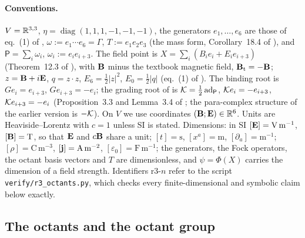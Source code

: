 \paragraph{Conventions.} $V=\mathbb{R}^{3,3}$, $\eta=\operatorname{diag}(1,1,1,-1,-1,-1)$, the generators $e_1,\dots,e_6$ are those of eq.~(1) of
\cite{ES17}, $\omega:=e_1\cdots e_6=\Gamma$, $T:=e_1e_2e_3$ (the mass form, Corollary~18.4 of \cite{ES17}), and $\mathsf P=\sum_i\omega_i$,
$\omega_i:=e_ie_{i+3}$. The field point is $X=\sum_i(B_ie_i+E_ie_{i+3})$ (Theorem~12.3 of \cite{ES17}), with $\mathbf B$ minus the textbook magnetic
field, $\mathbf B_{\rm t}=-\mathbf B$; $z=\mathbf B+i\mathbf E$, $q=z\cdot z$, $E_6=\tfrac12|z|^2$, $E_0=\tfrac12|q|$ (eq.~(1) of \cite{RE}). The binding root is
$Ge_i=e_{i+3}$, $Ge_{i+3}=-e_i$; the grading root of \cite{ES17} is $\mathcal K=\tfrac12\operatorname{ad}_{\mathsf P}$, $\mathcal K e_i=-e_{i+3}$, $\mathcal K e_{i+3}=-e_i$
(Proposition~3.3 and Lemma~3.4 of \cite{ES17}; the para-complex structure of the earlier version is $-\mathcal K$). On $V$ we use coordinates
$(\mathbf B;\mathbf E)\in\mathbb{R}^6$. Units are Heaviside--Lorentz with $c=1$ unless SI is stated. Dimensions: in SI $[\mathbf E]=\mathrm{V\,m^{-1}}$,
$[\mathbf B]=\mathrm T$, so that $\mathbf E$ and $c\mathbf B$ share a unit; $[t]=\mathrm s$, $[x^a]=\mathrm m$, $[\partial_a]=\mathrm m^{-1}$; $[\rho]=\mathrm{C\,m^{-3}}$,
$[\mathbf j]=\mathrm{A\,m^{-2}}$, $[\varepsilon_0]=\mathrm{F\,m^{-1}}$; the generators, the Fock operators, the octant basis vectors and $T$ are
dimensionless, and $\psi=\Phi(X)$ carries the dimension of a field strength. Identifiers r3-$n$ refer to the script
\texttt{verify/r3\_octants.py}, which checks every finite-dimensional and symbolic claim below exactly.

\subsection{The octants and the octant group}
\label{r3:sec:octants}

